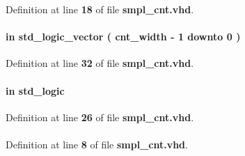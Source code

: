 Definition at line {\bf 18} of file {\bf smpl\+\_\+cnt.\+vhd}.

\paragraph[{data}]{ {\bfseries \textcolor{keywordflow}{in}\textcolor{vhdlchar}{ }} {\bfseries \textcolor{comment}{std\+\_\+logic\+\_\+vector}\textcolor{vhdlchar}{ }\textcolor{vhdlchar}{(}\textcolor{vhdlchar}{ }\textcolor{vhdlchar}{ }\textcolor{vhdlchar}{ }\textcolor{vhdlchar}{ }{\bfseries {\bf cnt\+\_\+width}} \textcolor{vhdlchar}{-\/}\textcolor{vhdlchar}{ } \textcolor{vhdldigit}{1} \textcolor{vhdlchar}{ }\textcolor{keywordflow}{downto}\textcolor{vhdlchar}{ }\textcolor{vhdlchar}{ } \textcolor{vhdldigit}{0} \textcolor{vhdlchar}{ }\textcolor{vhdlchar}{)}\textcolor{vhdlchar}{ }} \hspace{0.3cm}{\ttfamily [Port]}}\label{classsmpl__cnt_a9b720e9402f7152ff557a37515e49aa5}


Definition at line {\bf 32} of file {\bf smpl\+\_\+cnt.\+vhd}.

\paragraph[{ddr\+\_\+en}]{ {\bfseries \textcolor{keywordflow}{in}\textcolor{vhdlchar}{ }} {\bfseries \textcolor{comment}{std\+\_\+logic}\textcolor{vhdlchar}{ }} \hspace{0.3cm}{\ttfamily [Port]}}\label{classsmpl__cnt_adbfe05e6692f69f8e592df06c6055f0a}


Definition at line {\bf 26} of file {\bf smpl\+\_\+cnt.\+vhd}.

\paragraph[{ieee}]{\hspace{0.3cm}{\ttfamily [Library]}}\label{classsmpl__cnt_a0a6af6eef40212dbaf130d57ce711256}


Definition at line {\bf 8} of file {\bf smpl\+\_\+cnt.\+vhd}.


